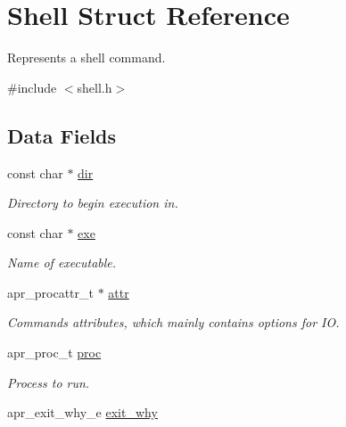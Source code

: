\hypertarget{structShell}{}\section{Shell Struct Reference}
\label{structShell}


Represents a shell command.  




{\ttfamily \#include $<$shell.\+h$>$}

\subsection*{Data Fields}
\begin{DoxyCompactItemize}
\item 
\hypertarget{structShell_af7f22d5f2b77da8d116c3c56799da8df}{}const char $\ast$ \hyperlink{structShell_af7f22d5f2b77da8d116c3c56799da8df}{dir}\label{structShell_af7f22d5f2b77da8d116c3c56799da8df}

\begin{DoxyCompactList}\small\item\em Directory to begin execution in. \end{DoxyCompactList}\item 
\hypertarget{structShell_aa383471cfa47390f167c9ccf20f96b1b}{}const char $\ast$ \hyperlink{structShell_aa383471cfa47390f167c9ccf20f96b1b}{exe}\label{structShell_aa383471cfa47390f167c9ccf20f96b1b}

\begin{DoxyCompactList}\small\item\em Name of executable. \end{DoxyCompactList}\item 
\hypertarget{structShell_ac69162f44ce6c9a5b1e942d59a0f564e}{}apr\+\_\+procattr\+\_\+t $\ast$ \hyperlink{structShell_ac69162f44ce6c9a5b1e942d59a0f564e}{attr}\label{structShell_ac69162f44ce6c9a5b1e942d59a0f564e}

\begin{DoxyCompactList}\small\item\em Command\textquotesingle{}s attributes, which mainly contains options for I\+O. \end{DoxyCompactList}\item 
\hypertarget{structShell_ab344de6664e18cea93fac216148cda0e}{}apr\+\_\+proc\+\_\+t \hyperlink{structShell_ab344de6664e18cea93fac216148cda0e}{proc}\label{structShell_ab344de6664e18cea93fac216148cda0e}

\begin{DoxyCompactList}\small\item\em Process to run. \end{DoxyCompactList}\item 
\hypertarget{structShell_a4d87736ab735660ffdc6addc55cda406}{}apr\+\_\+exit\+\_\+why\+\_\+e \hyperlink{structShell_a4d87736ab735660ffdc6addc55cda406}{exit\+\_\+why}\label{structShell_a4d87736ab735660ffdc6addc55cda406}


\end{DoxyCompactItemize}
